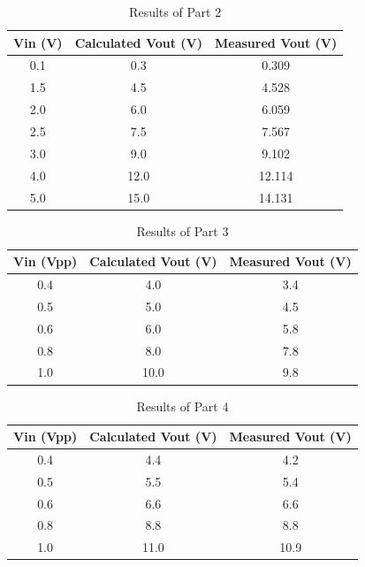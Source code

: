 \documentclass[CMPE]{KGCOEReport}
\begin{document}
\begin{table}[H]
    \centering
    \caption{Results of Part 2}
    \begin{tabular}{|c|c|c|}
        \hline
        Vin (V) & Calculated Vout (V) & Measured Vout (V) \\
        \hline
        0.1 & 0.3 & 0.309 \\
        \hline
        1.5 & 4.5 & 4.528 \\
        \hline
        2.0 & 6.0 & 6.059 \\
        \hline
        2.5 & 7.5 & 7.567 \\
        \hline
        3.0 & 9.0 & 9.102 \\
        \hline
        4.0 & 12.0 & 12.114 \\
        \hline
        5.0 & 15.0 & 14.131 \\
        \hline
    \end{tabular}
\end{table}

\begin{table}[H]
    \centering
    \caption{Results of Part 3}
    \begin{tabular}{|c|c|c|}
        \hline
        Vin (Vpp) & Calculated Vout (V) & Measured Vout (V) \\
        \hline
        0.4 & 4.0 & 3.4 \\
        \hline
        0.5 & 5.0 & 4.5 \\
        \hline
        0.6 & 6.0 & 5.8 \\
        \hline
        0.8 & 8.0 & 7.8 \\
        \hline
        1.0 & 10.0 & 9.8 \\
        \hline
    \end{tabular}
\end{table}

\begin{table}[H]
    \centering
    \caption{Results of Part 4}
    \begin{tabular}{|c|c|c|}
        \hline
        Vin (Vpp) & Calculated Vout (V) & Measured Vout (V) \\
        \hline
        0.4 & 4.4 & 4.2 \\
        \hline
        0.5 & 5.5 & 5.4 \\
        \hline
        0.6 & 6.6 & 6.6 \\
        \hline
        0.8 & 8.8 & 8.8 \\
        \hline
        1.0 & 11.0 & 10.9 \\
        \hline
    \end{tabular}
\end{table}
\end{document}
